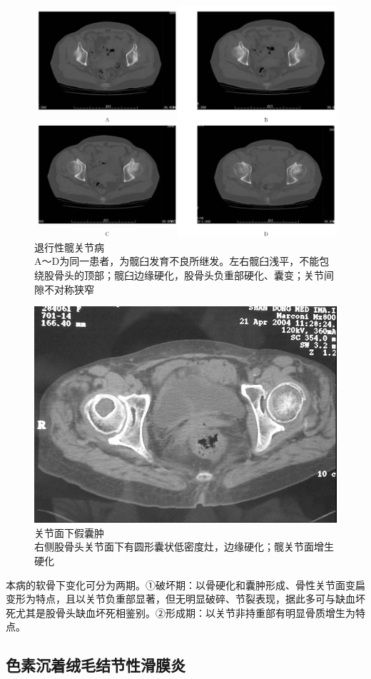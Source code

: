 \begin{figure}[!htbp]
 \centering
 \includegraphics[width=.7\textwidth,height=\textheight,keepaspectratio]{./images/Image00457.jpg}
 \captionsetup{justification=centering}
 \caption{退行性髋关节病\\{\small A～D为同一患者，为髋臼发育不良所继发。左右髋臼浅平，不能包绕股骨头的顶部；髋臼边缘硬化，股骨头负重部硬化、囊变；关节间隙不对称狭窄}}
 \label{fig22-31}
  \end{figure} 

\begin{figure}[!htbp]
 \centering
 \includegraphics[width=.7\textwidth,height=\textheight,keepaspectratio]{./images/Image00458.jpg}
 \captionsetup{justification=centering}
 \caption{关节面下假囊肿\\{\small 右侧股骨头关节面下有圆形囊状低密度灶，边缘硬化；髋关节面增生硬化}}
 \label{fig22-32}
  \end{figure} 

本病的软骨下变化可分为两期。①破坏期：以骨硬化和囊肿形成、骨性关节面变扁变形为特点，且以关节负重部显著，但无明显破碎、节裂表现，据此多可与缺血坏死尤其是股骨头缺血坏死相鉴别。②形成期：以关节非持重部有明显骨质增生为特点。

\subsection{色素沉着绒毛结节性滑膜炎}

